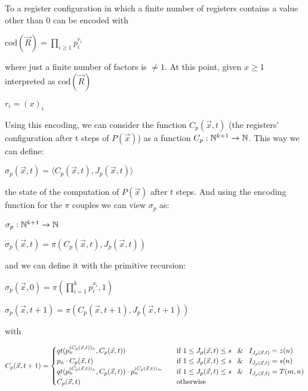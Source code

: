 To a register configuration  in which a finite number of registers contains a value other than 0 can be encoded with

\begin{center}
$\text{cod}(\vec{R}) = \prod\limits_{i \geq 1}p_i^{r_i}$
\end{center}

where just a finite number of factors is $\neq 1$. At this point, given $x \geq 1$ interpreted as $\text{cod}(\vec{R})$

\begin{center}
$r_i = (x)_i$
\end{center}

Using this encoding, we can consider the function $C_p(\vec{x},t)$ (the registers' configuration after t steps of $P(\vec{x})$) as a function $C_p : \mathbb{N}^{k+1} \rightarrow \mathbb{N}$. This way we can define:

\begin{center}
$\sigma_p(\vec{x},t) = \langle C_p(\vec{x},t), J_p(\vec{x},t) \rangle$
\end{center}

the state of the computation of $P(\vec{x})$ after $t$ steps. And using the encoding function for the $\pi$ couples we can view $\sigma_p$ as:

$\sigma_p : \mathbb{N}^{k+1} \rightarrow \mathbb{N}$

$\sigma_p(\vec{x}, t) = \pi(C_p(\vec{x},t), J_p(\vec{x},t))$

and we can define it with the primitive recursion:

$\sigma_p(\vec{x}, 0) = \pi(\prod\limits_{i=1}^k p_i^{x_i}, 1)$

$\sigma_p(\vec{x}, t+1) = \pi(C_p(\vec{x},t+1), J_p(\vec{x},t+1))$

with

\[
C_p(\vec{x},t+1) = \begin{cases}
qt(p_n^{(C_p(\vec{x},t))_n}, C_p(\vec{x},t)) & \quad \text{if }1 \leq J_p(\vec{x},t) \leq s \; \And \; I_{J_p(\vec{x},t)} = z(n) \\
p_n \cdot C_p(\vec{x},t) & \quad \text{if }1 \leq J_p(\vec{x},t) \leq s \; \And \; I_{J_p(\vec{x},t)} = s(n) \\
qt(p_n^{(C_p(\vec{x},t))_n}, C_p(\vec{x},t)) \cdot p_n^{(C_p(\vec{x},t))_m} & \quad \text{if }1 \leq J_p(\vec{x},t) \leq s \; \And \; I_{J_p(\vec{x},t)} = T(m,n) \\
C_p(\vec{x}, t) & \quad \text{otherwise}
\end{cases}
\]

